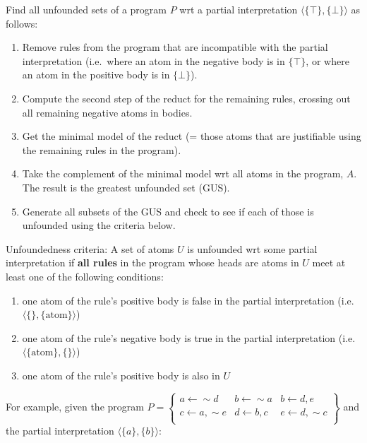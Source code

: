 \documentclass[9pt,a4paper,landscape]{article}
\begin{document}
{Find all unfounded sets of a program $P$ wrt a partial interpretation $\langle \{\top\}, \{\bot\} \rangle$ as follows:
\begin{enumerate}[noitemsep]
	\item Remove rules from the program that are incompatible with the partial interpretation (i.e.\ where an atom in the negative body is in $\{\top\}$, or where an atom in the positive body is in $\{\bot\}$).
	\item Compute the second step of the reduct for the remaining rules, crossing out all remaining negative atoms in bodies.
	\item Get the minimal model of the reduct (= those atoms that are justifiable using the remaining rules in the program).
	\item Take the complement of the minimal model wrt all atoms in the program, $A$. The result is the greatest unfounded set (GUS).
	\item Generate all subsets of the GUS and check to see if each of those is unfounded using the criteria below.
\end{enumerate}

Unfoundedness criteria: A set of atoms $U$ is unfounded wrt some partial interpretation if \textbf{all rules} in the program whose heads are atoms in $U$ meet at least one of the following conditions:

\begin{enumerate}[noitemsep, label=(\roman*)]
	\item one atom of the rule's positive body is false in the partial interpretation (i.e.\  $\langle \{\}, \{\text{atom}\} \rangle$)
	\item one atom of the rule's negative body is true in the partial interpretation (i.e.\  $\langle \{\text{atom}\}, \{\} \rangle$)
	\item one atom of the rule's positive body is also in $U$
\end{enumerate}

For example, given the program $P = \left\{\begin{array}{lll}
a \leftarrow {\sim} d & b \leftarrow {\sim} a & b \leftarrow d, e\\
c \leftarrow a, {\sim} e & d \leftarrow b, c & e \leftarrow d, {\sim} c\\
\end{array}\right\}$ and the partial interpretation $\langle \{a\}, \{b\} \rangle$:

}
\end{document}
